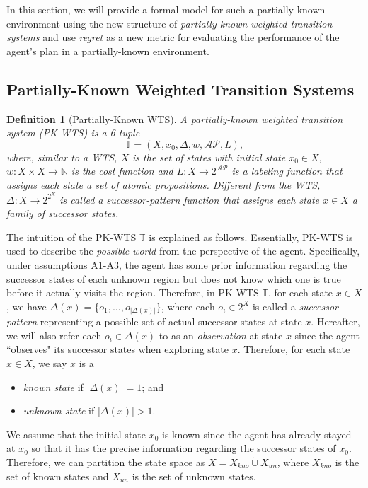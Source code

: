 \documentclass{ifacconf}
\newtheorem{definition}{Definition}
\def \AP{\mathcal{AP}}
\def \NN{\mathbb{N}}
\def \T{\mathbb{T}}
\begin{document}
In this section, we will   provide a formal model for such a partially-known environment using the new structure of \emph{partially-known weighted transition systems} and use \emph{regret} as a new metric for evaluating the performance of the  agent's plan in a partially-known environment.


\subsection{Partially-Known Weighted Transition Systems}

\begin{definition}[Partially-Known WTS]
A partially-known weighted transition system (PK-WTS) is a 6-tuple 
\[
\T=(X,x_0,\Delta,w,\AP,L), 
\]
where, similar  to a WTS, 
$X$ is the set of states with initial state $x_0\!\in\! X$, 
$w\!:\!X\times X\!\to\!\NN$ is the cost function 
and $L\!:\!X\!\to\! 2^\AP$ is a labeling function that assigns each state a set of atomic propositions.  
Different from the WTS, 
$\Delta:X\to 2^{2^X}$
is called a \emph{successor-pattern function} that assigns each state $x\in X$ a family of successor states.  \vspace{3pt}
\end{definition} 


The intuition of the PK-WTS $\T$ is explained as follows. 
Essentially, PK-WTS is used to describe the \emph{possible world} from the perspective of the agent. Specifically, under  assumptions A1-A3, the agent has some prior information regarding the successor states of each unknown region but does not know which one is true before it actually visits the region. Therefore, in PK-WTS $\T$, for each state $x\!\in\! X$,  we have $\Delta(x)=\{o_1,\dots,o_{|\Delta(x)|}\}$, where
each $o_i\in 2^X$ is called a \emph{successor-pattern} representing a possible  set of actual successor states at state $x$.  
Hereafter, we will also refer each $o_i\in \Delta(x)$ to as an \emph{observation} at state $x$ since the agent ``observes" its successor states when exploring state $x$. 
Therefore, for each state $x\in X$, we say $x$ is a
\begin{itemize}
    \item 
    \emph{known state}  if $|\Delta(x)|=1$; and 
    \item
    \emph{unknown state}  if $|\Delta(x)|>1$. 
\end{itemize}
We assume that the initial state $x_0$ is known since the agent has already stayed at $x_0$ so that it has the precise information regarding the successor states of $x_0$. 
Therefore, we can partition the state space as 
$X=X_{kno}\dot{\cup}X_{un}$,
where $X_{kno}$ is the set of known states and $X_{un}$ is the set of unknown states.  
\end{document}
